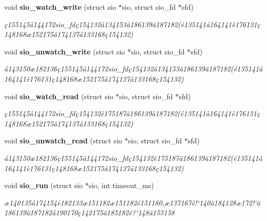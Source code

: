 \begin{CompactItemize}
void {\bf sio\_\-watch\_\-write} (struct sio $\ast$sio, struct sio\_\-fd $\ast$sfd)
\begin{CompactList}\small\item\em \c{c}155145\aa{}144172sio\_\-fd\c{c}154132\aa{}134153\"{a}186139\"{a}187182(\'{e}135141\aa{}164141\`{e}176131\c{c}148168\ae{}152175\aa{}174137\aa{}133168\c{c}154132) \item\end{CompactList}\item 
void {\bf sio\_\-unwatch\_\-write} (struct sio $\ast$sio, struct sio\_\-fd $\ast$sfd)
\begin{CompactList}\small\item\em \aa{}143150\ae{}182136\c{c}155145\aa{}144172sio\_\-fd\c{c}154132\aa{}134153\"{a}186139\"{a}187182(\'{e}135141\aa{}164141\`{e}176131\c{c}148168\ae{}152175\aa{}174137\aa{}133168\c{c}154132) \item\end{CompactList}\item 
void {\bf sio\_\-watch\_\-read} (struct sio $\ast$sio, struct sio\_\-fd $\ast$sfd)
\begin{CompactList}\small\item\em \c{c}155145\aa{}144172sio\_\-fd\c{c}154132\`{e}175187\"{a}186139\"{a}187182(\'{e}135141\aa{}164141\`{e}176131\c{c}148168\ae{}152175\aa{}174137\aa{}133168\c{c}154132) \item\end{CompactList}\item 
void {\bf sio\_\-unwatch\_\-read} (struct sio $\ast$sio, struct sio\_\-fd $\ast$sfd)
\begin{CompactList}\small\item\em \aa{}143150\ae{}182136\c{c}155145\aa{}144172sio\_\-fd\c{c}154132\`{e}175187\"{a}186139\"{a}187182(\'{e}135141\aa{}164141\`{e}176131\c{c}148168\ae{}152175\aa{}174137\aa{}133168\c{c}154132) \item\end{CompactList}\item 
void {\bf sio\_\-run} (struct sio $\ast$sio, int timeout\_\-ms)
\begin{CompactList}\small\item\em \ae{}140135\aa{}174154\`{e}182133\ae{}151182\ae{}151182\'{e}151180,\ae{}137167\`{e}!`140\"{a}184128\ae{}172!`\"{a}186139\"{a}187182\aa{}190170\c{c}142175\aa{}185182\`{e}?`148\aa{}155158 \item\end{CompactList}\item 

\end{CompactItemize}
